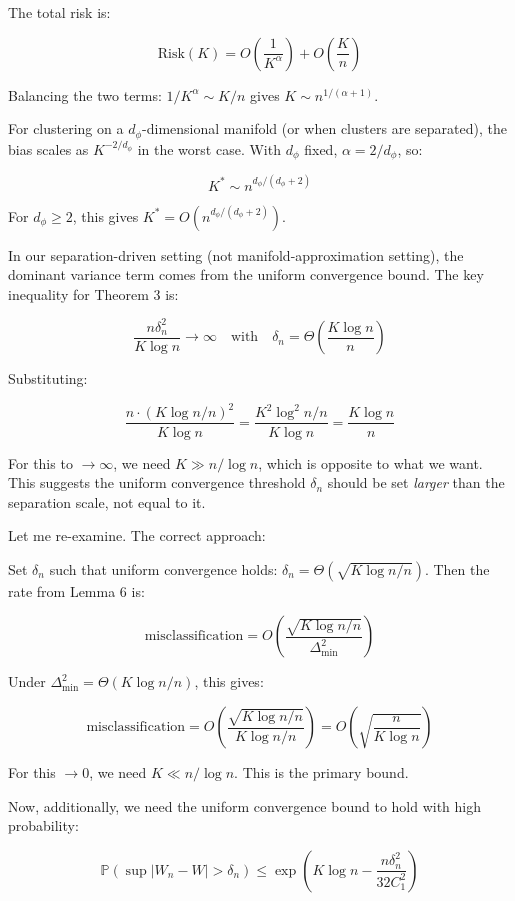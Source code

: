 \documentclass[
  12pt,
]{article}
\begin{document}
The total risk is:

\[\text{Risk}(K) = O\left(\frac{1}{K^{\alpha}}\right) + O\left(\frac{K}{n}\right)\]

Balancing the two terms: \(1/K^{\alpha} \sim K/n\) gives
\(K \sim n^{1/(\alpha+1)}\).

For clustering on a \(d_\phi\)-dimensional manifold (or when clusters
are separated), the bias scales as \(K^{-2/d_\phi}\) in the worst case.
With \(d_\phi\) fixed, \(\alpha = 2/d_\phi\), so:

\[K^* \sim n^{d_\phi/(d_\phi+2)}\]

For \(d_\phi \geq 2\), this gives \(K^* = O(n^{d_\phi/(d_\phi+2)})\).

In our separation-driven setting (not manifold-approximation setting),
the dominant variance term comes from the uniform convergence bound. The
key inequality for Theorem 3 is:

\[\frac{n\delta_n^2}{K \log n} \to \infty \quad \text{with} \quad \delta_n = \Theta\left(\frac{K \log n}{n}\right)\]

Substituting:

\[\frac{n \cdot (K \log n / n)^2}{K \log n} = \frac{K^2 \log^2 n / n}{K \log n} = \frac{K \log n}{n}\]

For this to \(\to \infty\), we need \(K \gg n / \log n\), which is
opposite to what we want. This suggests the uniform convergence
threshold \(\delta_n\) should be set \emph{larger} than the separation
scale, not equal to it.

Let me re-examine. The correct approach:

Set \(\delta_n\) such that uniform convergence holds:
\(\delta_n = \Theta(\sqrt{K \log n / n})\). Then the rate from Lemma 6
is:

\[\text{misclassification} = O\left(\frac{\sqrt{K \log n / n}}{\Delta_{\min}^2}\right)\]

Under \(\Delta_{\min}^2 = \Theta(K \log n / n)\), this gives:

\[\text{misclassification} = O\left(\frac{\sqrt{K \log n / n}}{K \log n / n}\right) = O\left(\sqrt{\frac{n}{K \log n}}\right)\]

For this \(\to 0\), we need \(K \ll n / \log n\). This is the primary
bound.

Now, additionally, we need the uniform convergence bound to hold with
high probability:

\[\mathbb{P}(\sup |W_n - W| > \delta_n) \leq \exp\left(K \log n - \frac{n \delta_n^2}{32 C_1^2}\right)\]
\end{document}
